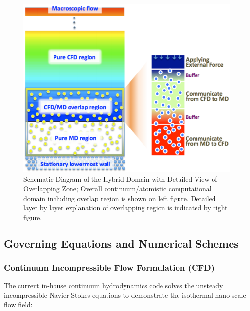 \documentclass[preprint,12pt]{elsarticle}
\begin{document}
\begin{figure}
\centering
\includegraphics[width=0.8\linewidth]{Couette7.pdf}
\vskip-0.2cm
\caption{\small Schematic Diagram of the Hybrid Domain with Detailed View of Overlapping Zone; Overall continuum/atomistic computational domain including overlap region is shown on left figure. Detailed layer by layer explanation of overlapping region is indicated by right figure.}
\label{Fig:Couette}
\vspace{-1em}
\end{figure}



\subsection{Governing Equations and Numerical Schemes} 

\subsubsection{Continuum Incompressible Flow Formulation (CFD)}

The current in-house continuum hydrodynamics code solves the unsteady incompressible Navier-Stokes equations to demonstrate the isothermal nano-scale flow field:
\end{document}
